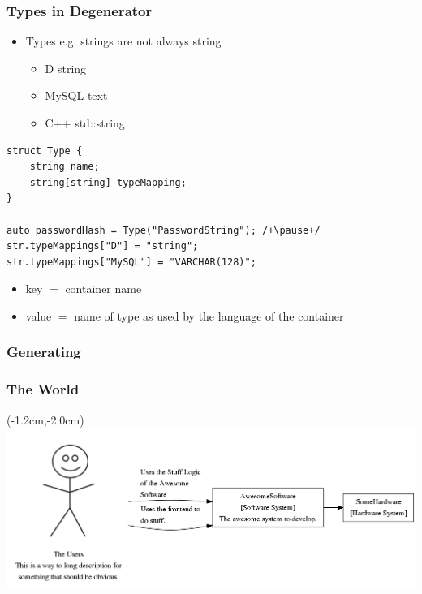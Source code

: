 \documentclass[xelatex,13pt]{beamer}
\begin{document}
\begin{frame}[fragile]
	\frametitle{Types in Degenerator}
	\begin{itemize}
		\item Types \pause e.g. strings are not always string
		\pause
		\begin{itemize}
			\item D string
			\item MySQL text
			\item C++ std::string
		\end{itemize}
	\end{itemize}
	\pause
	\begin{lstlisting}[basicstyle=\scriptsize]
struct Type {
    string name;
    string[string] typeMapping;
}

auto passwordHash = Type("PasswordString"); /+\pause+/
str.typeMappings["D"] = "string";
str.typeMappings["MySQL"] = "VARCHAR(128)";
\end{lstlisting}
	\vspace{-1cm}
\pause
\begin{itemize}
	\item key \(=\) container name
	\item value \(=\) name of type as used by the language of the container
\end{itemize}
\end{frame}

\begin{frame}
	\frametitle{Generating}
	
	
\end{frame}

\begin{frame}
	\frametitle{The World}
	\begin{textblock*}{0cm}(-1.2cm,-2.0cm)
		\includegraphics[width=1.0\paperwidth]{theworld.png}
	\end{textblock*}
\end{frame}
\end{document}
